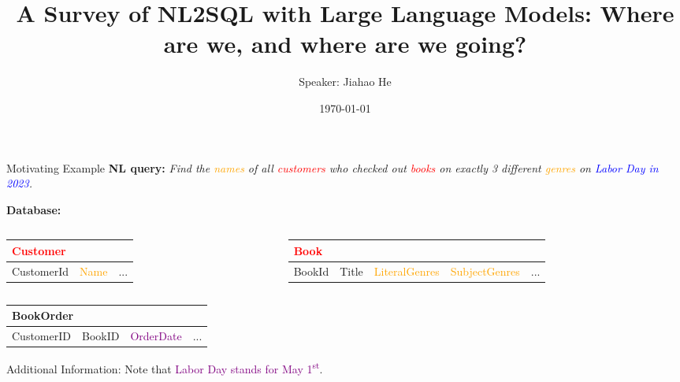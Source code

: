\documentclass[aspectratio=169,xcolor=dvipsnames]{beamer}
\title{A Survey of NL2SQL with Large Language Models: Where are we, and where are we going?}
\author{Speaker: Jiahao He}
\institute
{
    School of Information \\
    Renmin University of China %
}
\date{\today} %
\begin{document}
\begin{frame}
    \titlepage
\end{frame}


\begin{frame}{Motivating Example}
    \textbf{NL query: }\textit{Find the \textcolor{orange}{names} of all \textcolor{red}{customers} who checked out \textcolor{red}{books} on exactly 3 different \textcolor{orange}{genres} on \textcolor{blue}{Labor Day in 2023}.}

    \textbf{Database:}

    \begin{columns}[T]
        \begin{column}{.3\textwidth}
            \begin{table}
                \begin{tabular}{l l l}
                    \toprule
                    \multicolumn{3}{l}{\textcolor{red}{Customer}} \\
                    \midrule
                    CustomerId         & \textcolor{orange}{Name}          & ...\\
                    \bottomrule
                \end{tabular}
            \end{table}
        \end{column}

        \begin{column}{.6\textwidth}
            \begin{table}
                \begin{tabular}{l l l l l}
                    \toprule
                    \multicolumn{5}{l}{\textcolor{red}{Book}} \\
                    \midrule
                    BookId         & Title          &\textcolor{orange}{LiteralGenres} & \textcolor{orange}{SubjectGenres} & ...\\
                    \bottomrule
                \end{tabular}
            \end{table}
        \end{column}
    \end{columns}

    \begin{table}
        \begin{tabular}{l l l l}
            \toprule
            \multicolumn{4}{l}{BookOrder} \\
            \midrule
            CustomerID         & BookID          &\textcolor{purple}{OrderDate} & ...\\
            \bottomrule
        \end{tabular}
    \end{table}
    Additional Information: Note that \textcolor{purple}{Labor Day stands for May 1\textsuperscript{st}}.
\end{frame}
\end{document}
